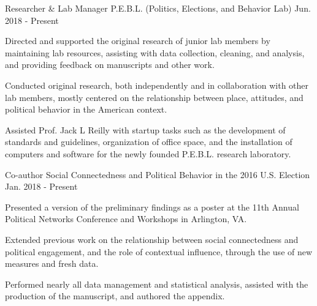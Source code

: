 

\begin{cventries}

    \cventry
      {Researcher \& Lab Manager} %
      {P.E.B.L. (Politics, Elections, and Behavior Lab)} %
      {Jun. 2018 - Present} %
      {} %
      {
        \begin{cvitems} %
          \item {Directed and supported the original research of junior lab members by maintaining lab resources, assisting with data collection, cleaning, and analysis, and providing feedback on manuscripts and other work.}
          \item {Conducted original research, both independently and in collaboration with other lab members, mostly centered on the relationship between place, attitudes, and political behavior in the American context.}
          \item {Assisted Prof. Jack L Reilly with startup tasks such as the development of standards and guidelines, organization of office space, and the installation of computers and software for the newly founded P.E.B.L. research laboratory.}
      \end{cvitems}
      }


    \cventry
      {Co-author} %
      {Social Connectedness and Political Behavior in the 2016 U.S. Election} %
      {Jan. 2018 - Present} %
      {} %
      {
        \begin{cvitems} %
          \item {Presented a version of the preliminary findings as a poster at the 11th Annual Political Networks Conference and Workshops in Arlington, VA.}
          \item {Extended previous work on the relationship between social connectedness and political engagement, and the role of contextual influence, through the use of new measures and fresh data.}
          \item {Performed nearly all data management and statistical analysis, assisted with the production of the manuscript, and authored the appendix.}
        \end{cvitems}
      }



\end{cventries}
